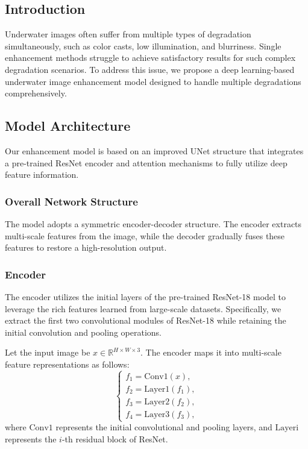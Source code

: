 \documentclass{apmcmthesis}
\begin{document}
\subsection{Introduction}
Underwater images often suffer from multiple types of degradation simultaneously, such as color casts, low illumination, and blurriness. Single enhancement methods struggle to achieve satisfactory results for such complex degradation scenarios. To address this issue, we propose a deep learning-based underwater image enhancement model designed to handle multiple degradations comprehensively.

\subsection{Model Architecture}
Our enhancement model is based on an improved UNet structure that integrates a pre-trained ResNet encoder and attention mechanisms to fully utilize deep feature information.

\subsubsection{Overall Network Structure}
The model adopts a symmetric encoder-decoder structure. The encoder extracts multi-scale features from the image, while the decoder gradually fuses these features to restore a high-resolution output.


\subsubsection{Encoder}
The encoder utilizes the initial layers of the pre-trained ResNet-18 model to leverage the rich features learned from large-scale datasets. Specifically, we extract the first two convolutional modules of ResNet-18 while retaining the initial convolution and pooling operations.

Let the input image be $x \in \mathbb{R}^{H \times W \times 3}$. The encoder maps it into multi-scale feature representations as follows:
\[
\begin{cases}
f_1 = \text{Conv1}(x), \\
f_2 = \text{Layer1}(f_1), \\
f_3 = \text{Layer2}(f_2), \\
f_4 = \text{Layer3}(f_3),
\end{cases}
\]
where $\text{Conv1}$ represents the initial convolutional and pooling layers, and $\text{Layeri}$ represents the $i$-th residual block of ResNet.
\end{document}
